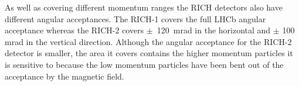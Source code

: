 As well as covering different momentum ranges the RICH detectors also have different angular acceptances. The RICH-1 covers the full LHCb angular acceptance whereas the RICH-2 covers $\pm$~120~mrad in the horizontal and $\pm$ 100 mrad in the vertical direction. 
Although the angular acceptance for the RICH-2 detector is smaller, the area it covers contains the higher momentum particles it is sensitive to because the low momentum particles have been bent out of the acceptance by the magnetic field.







 
